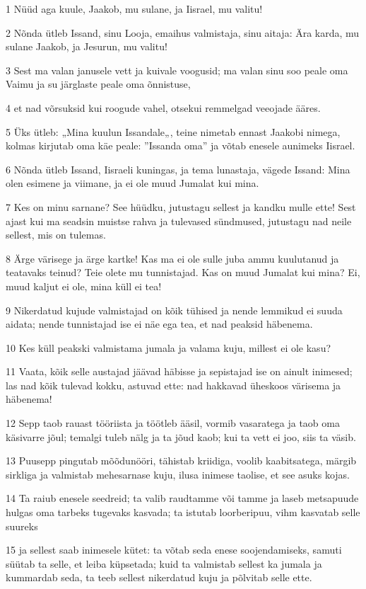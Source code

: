 \par 1 Nüüd aga kuule, Jaakob, mu sulane, ja Iisrael, mu valitu!
\par 2 Nõnda ütleb Issand, sinu Looja, emaihus valmistaja, sinu aitaja: Ära karda, mu sulane Jaakob, ja Jesurun, mu valitu!
\par 3 Sest ma valan janusele vett ja kuivale voogusid; ma valan sinu soo peale oma Vaimu ja su järglaste peale oma õnnistuse,
\par 4 et nad võrsuksid kui roogude vahel, otsekui remmelgad veeojade ääres.
\par 5 Üks ütleb: „Mina kuulun Issandale„, teine nimetab ennast Jaakobi nimega, kolmas kirjutab oma käe peale: ”Issanda oma” ja võtab enesele aunimeks Iisrael.
\par 6 Nõnda ütleb Issand, Iisraeli kuningas, ja tema lunastaja, vägede Issand: Mina olen esimene ja viimane, ja ei ole muud Jumalat kui mina.
\par 7 Kes on minu sarnane? See hüüdku, jutustagu sellest ja kandku mulle ette! Sest ajast kui ma seadsin muistse rahva ja tulevased sündmused, jutustagu nad neile sellest, mis on tulemas.
\par 8 Ärge värisege ja ärge kartke! Kas ma ei ole sulle juba ammu kuulutanud ja teatavaks teinud? Teie olete mu tunnistajad. Kas on muud Jumalat kui mina? Ei, muud kaljut ei ole, mina küll ei tea!
\par 9 Nikerdatud kujude valmistajad on kõik tühised ja nende lemmikud ei suuda aidata; nende tunnistajad ise ei näe ega tea, et nad peaksid häbenema.
\par 10 Kes küll peakski valmistama jumala ja valama kuju, millest ei ole kasu?
\par 11 Vaata, kõik selle austajad jäävad häbisse ja sepistajad ise on ainult inimesed; las nad kõik tulevad kokku, astuvad ette: nad hakkavad üheskoos värisema ja häbenema!
\par 12 Sepp taob rauast tööriista ja töötleb ääsil, vormib vasaratega ja taob oma käsivarre jõul; temalgi tuleb nälg ja ta jõud kaob; kui ta vett ei joo, siis ta väsib.
\par 13 Puusepp pingutab mõõdunööri, tähistab kriidiga, voolib kaabitsatega, märgib sirkliga ja valmistab mehesarnase kuju, ilusa inimese taolise, et see asuks kojas.
\par 14 Ta raiub enesele seedreid; ta valib raudtamme või tamme ja laseb metsapuude hulgas oma tarbeks tugevaks kasvada; ta istutab loorberipuu, vihm kasvatab selle suureks
\par 15 ja sellest saab inimesele kütet: ta võtab seda enese soojendamiseks, samuti süütab ta selle, et leiba küpsetada; kuid ta valmistab sellest ka jumala ja kummardab seda, ta teeb sellest nikerdatud kuju ja põlvitab selle ette.
